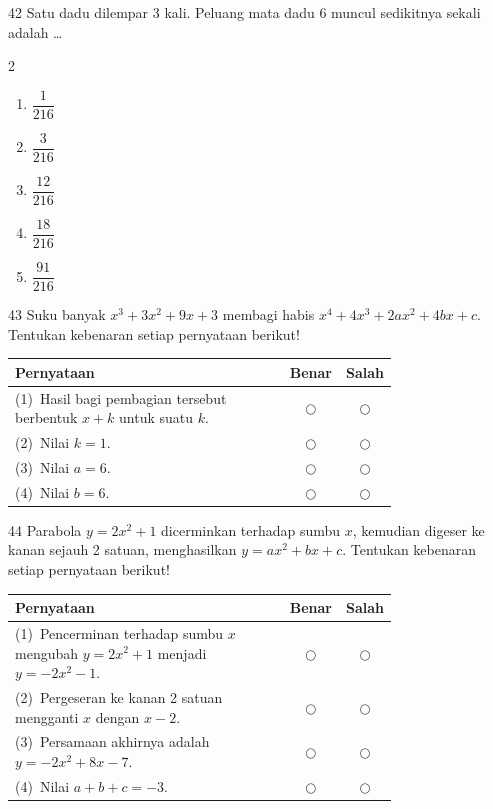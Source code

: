 \documentclass[11pt]{article}
\newenvironment{pilB}{%
  \par\smallskip\begin{multicols}{2}
  \begin{enumerate}[label=(\Alph*),leftmargin=*,itemsep=1pt,topsep=3pt]}%
  {\end{enumerate}\end{multicols}}
\begin{document}
\begin{soal}{42}
Satu dadu dilempar 3 kali. Peluang mata dadu 6 muncul sedikitnya
sekali adalah \ldots
\begin{pilB}
  \item $\dfrac{1}{216}$ \item $\dfrac{3}{216}$ \item $\dfrac{12}{216}$
  \item $\dfrac{18}{216}$ \item $\dfrac{91}{216}$
\end{pilB}
\end{soal}

\begin{soal}{43}
Suku banyak $x^3+3x^2+9x+3$ membagi habis $x^4+4x^3+2ax^2+4bx+c$.
Tentukan kebenaran setiap pernyataan berikut!

\par\smallskip
{\renewcommand{\arraystretch}{1.4}%
\begin{tabular}{@{}p{0.76\linewidth}cc@{}}
\hline
\textbf{Pernyataan} & \textbf{Benar} & \textbf{Salah}\\
\hline
(1)~Hasil bagi pembagian tersebut berbentuk $x+k$ untuk suatu $k$.
  & $\bigcirc$ & $\bigcirc$\\
(2)~Nilai $k=1$.
  & $\bigcirc$ & $\bigcirc$\\
(3)~Nilai $a=6$.
  & $\bigcirc$ & $\bigcirc$\\
(4)~Nilai $b=6$.
  & $\bigcirc$ & $\bigcirc$\\
\hline
\end{tabular}}
\end{soal}

\begin{soal}{44}
Parabola $y=2x^2+1$ dicerminkan terhadap sumbu $x$, kemudian digeser
ke kanan sejauh 2 satuan, menghasilkan $y=ax^2+bx+c$.
Tentukan kebenaran setiap pernyataan berikut!

\par\smallskip
{\renewcommand{\arraystretch}{1.4}%
\begin{tabular}{@{}p{0.76\linewidth}cc@{}}
\hline
\textbf{Pernyataan} & \textbf{Benar} & \textbf{Salah}\\
\hline
(1)~Pencerminan terhadap sumbu $x$ mengubah $y=2x^2+1$ menjadi
    $y=-2x^2-1$.
  & $\bigcirc$ & $\bigcirc$\\
(2)~Pergeseran ke kanan 2 satuan mengganti $x$ dengan $x-2$.
  & $\bigcirc$ & $\bigcirc$\\
(3)~Persamaan akhirnya adalah $y=-2x^2+8x-7$.
  & $\bigcirc$ & $\bigcirc$\\
(4)~Nilai $a+b+c = -3$.
  & $\bigcirc$ & $\bigcirc$\\
\hline
\end{tabular}}
\end{soal}
\end{document}
